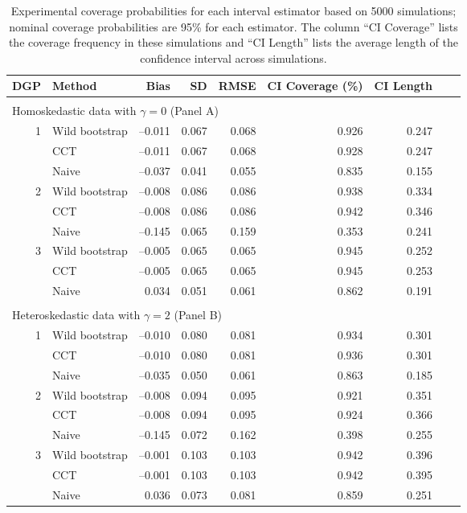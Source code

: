 \documentclass[12pt,fleqn]{article}
\begin{document}
\begin{table}[t]
  \centering
  \begin{tabular}{rlrrrrrrr}
    \toprule
    DGP & Method       & Bias    & SD    & RMSE  & CI Coverage (\%) & CI Length \\
    \midrule                                                     \\
    \multicolumn{7}{l}{Homoskedastic data with $\gamma = 0$ (Panel A)}  \\
    \midrule
    1 & Wild bootstrap & --0.011 & 0.067 & 0.068 & 0.926 & 0.247 \\ 
      & CCT            & --0.011 & 0.067 & 0.068 & 0.928 & 0.247 \\ 
      & Naive          & --0.037 & 0.041 & 0.055 & 0.835 & 0.155 \\ 
    2 & Wild bootstrap & --0.008 & 0.086 & 0.086 & 0.938 & 0.334 \\ 
      & CCT            & --0.008 & 0.086 & 0.086 & 0.942 & 0.346 \\
      & Naive          & --0.145 & 0.065 & 0.159 & 0.353 & 0.241 \\
    3 & Wild bootstrap & --0.005 & 0.065 & 0.065 & 0.945 & 0.252 \\ 
      & CCT            & --0.005 & 0.065 & 0.065 & 0.945 & 0.253 \\ 
      & Naive          &   0.034 & 0.051 & 0.061 & 0.862 & 0.191 \\ \\
    \multicolumn{7}{l}{Heteroskedastic data with $\gamma = 2$ (Panel B)}  \\
    \midrule
    1 & Wild bootstrap & --0.010 & 0.080 & 0.081 & 0.934 & 0.301 \\
      & CCT            & --0.010 & 0.080 & 0.081 & 0.936 & 0.301 \\
      & Naive          & --0.035 & 0.050 & 0.061 & 0.863 & 0.185 \\ 
    2 & Wild bootstrap & --0.008 & 0.094 & 0.095 & 0.921 & 0.351 \\ 
      & CCT            & --0.008 & 0.094 & 0.095 & 0.924 & 0.366 \\
      & Naive          & --0.145 & 0.072 & 0.162 & 0.398 & 0.255 \\  
    3 & Wild bootstrap & --0.001 & 0.103 & 0.103 & 0.942 & 0.396 \\ 
      & CCT            & --0.001 & 0.103 & 0.103 & 0.942 & 0.395 \\ 
      & Naive          &   0.036 & 0.073 & 0.081 & 0.859 & 0.251 \\  
    \bottomrule
  \end{tabular}
  \caption{%
    Experimental coverage probabilities for each interval estimator based on 5000
    simulations; nominal coverage probabilities are 95\% for each estimator. The column
    ``CI Coverage'' lists the coverage frequency in these simulations and ``CI Length''
    lists the average length of the confidence interval across simulations.}
  \label{tbl:1}
\end{table}
\end{document}
